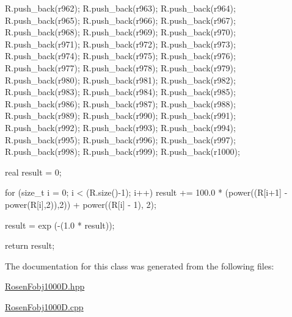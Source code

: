 \begin{DoxyCode}
{R.push_back(r962);
R.push_back(r963);
R.push_back(r964);
R.push_back(r965);
R.push_back(r966);
R.push_back(r967);
R.push_back(r968);
R.push_back(r969);
R.push_back(r970);
R.push_back(r971);
R.push_back(r972);
R.push_back(r973);
R.push_back(r974);
R.push_back(r975);
R.push_back(r976);
R.push_back(r977);
R.push_back(r978);
R.push_back(r979);
R.push_back(r980);
R.push_back(r981);
R.push_back(r982);
R.push_back(r983);
R.push_back(r984);
R.push_back(r985);
R.push_back(r986);
R.push_back(r987);
R.push_back(r988);
R.push_back(r989);
R.push_back(r990);
R.push_back(r991);
R.push_back(r992);
R.push_back(r993);
R.push_back(r994);
R.push_back(r995);
R.push_back(r996);
R.push_back(r997);
R.push_back(r998);
R.push_back(r999);
R.push_back(r1000);
    
    real result = 0;
    
    for (size_t i = 0; i < (R.size()-1); i++) 
    {
      result += 100.0 * (power((R[i+1] - power(R[i],2)),2)) +
                  power((R[i] - 1), 2);
    }

  result = exp (-(1.0 * result));

   return result;
}
\end{DoxyCode}


\-The documentation for this class was generated from the following files\-:\begin{DoxyCompactItemize}
\item 
\hyperlink{RosenFobj1000D_8hpp}{\-Rosen\-Fobj1000\-D.\-hpp}\item 
\hyperlink{RosenFobj1000D_8cpp}{\-Rosen\-Fobj1000\-D.\-cpp}\end{DoxyCompactItemize}
